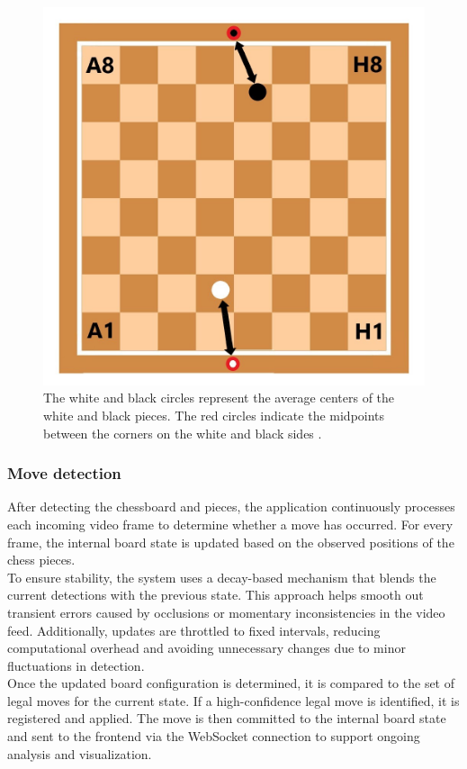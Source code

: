 \begin{figure}[h!]
\centering
\includegraphics[width=0.70\linewidth]{figures/methods/ml-models/label_assignment_board.jpg}
\caption[Assigning labels to chessboard]{The white and black circles represent the average centers of the white and black pieces. The red circles indicate the midpoints between the corners on the white and black sides \cite{vectorstock:chessboard-svg}.}
\label{fig:board_label_assignment}
\end{figure}


\subsubsection*{Move detection}
After detecting the chessboard and pieces, the application continuously processes each incoming video frame to determine whether a move has occurred. For every frame, the internal board state is updated based on the observed positions of the chess pieces. \\

To ensure stability, the system uses a decay-based mechanism that blends the current detections with the previous state. This approach helps smooth out transient errors caused by occlusions or momentary inconsistencies in the video feed. Additionally, updates are throttled to fixed intervals, reducing computational overhead and avoiding unnecessary changes due to minor fluctuations in detection. \\

Once the updated board configuration is determined, it is compared to the set of legal moves for the current state. If a high-confidence legal move is identified, it is registered and applied. The move is then committed to the internal board state and sent to the frontend via the WebSocket connection to support ongoing analysis and visualization.


